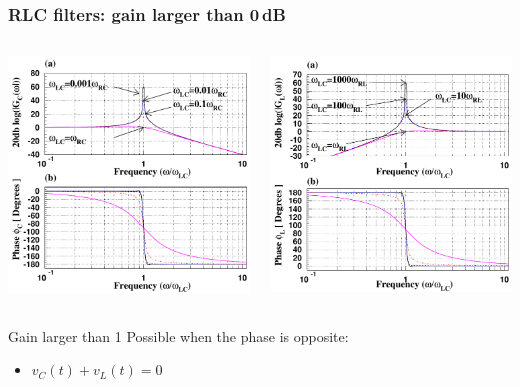 \documentclass[beamer]{standalone}
\begin{document}
\begin{frame}
 \frametitle{RLC filters: gain larger than 0\,dB}
 \begin{columns}
  \begin{column}{0.5\textwidth}
   \includegraphics[width=\textwidth]{pics/RLC_bode_capacitor}   
  \end{column}
  \begin{column}{0.5\textwidth}
   \includegraphics[width=\textwidth]{pics/RLC_bode_inductor}
  \end{column}
 \end{columns}
 \begin{block}{Gain larger than 1}
  Possible when the phase is opposite:
  \begin{itemize}
   \item $v_C(t) + v_L(t) = 0$
  \end{itemize}
 \end{block}
\end{frame}
\end{document}
